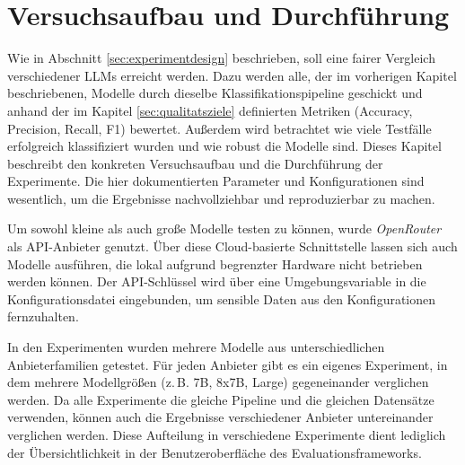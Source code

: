 \chapter{Versuchsaufbau und Durchführung}\label{ch:versuchsaufbau-und-durchfuhrung}

Wie in Abschnitt \ref{sec:experimentdesign} beschrieben, soll eine fairer Vergleich verschiedener \acp{LLM} erreicht werden. Dazu werden alle, der im vorherigen Kapitel beschriebenen, Modelle durch dieselbe Klassifikationspipeline geschickt und anhand der im Kapitel \ref{sec:qualitatsziele} definierten Metriken (Accuracy, Precision, Recall, F1) bewertet. Außerdem wird betrachtet wie viele Testfälle erfolgreich klassifiziert wurden und wie robust die Modelle sind. Dieses Kapitel beschreibt den konkreten Versuchsaufbau und die Durchführung der Experimente. Die hier dokumentierten Parameter und Konfigurationen sind wesentlich, um die Ergebnisse nachvollziehbar und reproduzierbar zu machen.

Um sowohl kleine als auch große Modelle testen zu können, wurde \emph{OpenRouter} \cite{openrouter} als API-Anbieter genutzt. Über diese Cloud-basierte Schnittstelle lassen sich auch Modelle ausführen, die lokal aufgrund begrenzter Hardware nicht betrieben werden können. Der API-Schlüssel wird über eine Umgebungsvariable in die Konfigurationsdatei eingebunden, um sensible Daten aus den Konfigurationen fernzuhalten.

In den Experimenten wurden mehrere Modelle aus unterschiedlichen Anbieterfamilien getestet. Für jeden Anbieter gibt es ein eigenes Experiment, in dem mehrere Modellgrößen (z.\,B. 7B, 8x7B, Large) gegeneinander verglichen werden. Da alle Experimente die gleiche Pipeline und die gleichen Datensätze verwenden, können auch die Ergebnisse verschiedener Anbieter untereinander verglichen werden. Diese Aufteilung in verschiedene Experimente dient lediglich der Übersichtlichkeit in der Benutzeroberfläche des Evaluationsframeworks.




